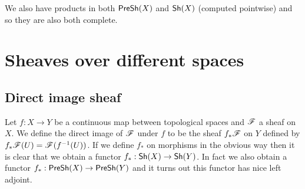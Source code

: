 \documentclass{memoir}
\begin{document}
We also have products in both ${\normalfont\mathsf{PreSh}}(X)$ and ${\normalfont\mathsf{Sh}}(X)$ (computed pointwise) and so they are also both complete.
\section{Sheaves over different spaces}
\subsection{Direct image sheaf}
Let $f:X\to Y$ be a continuous map between topological spaces and $\mathscr{F}$ a sheaf on $X$.
We define the direct image of $\mathscr{F}$ under $f$ to be the sheaf $f_*\mathscr{F}$ on $Y$ defined by $f_*\mathscr{F}(U) = \mathscr{F}(f^{-1}(U))$.
If we define $f_*$ on morphisms in the obvious way then it is clear that we obtain a functor $f_*:{\normalfont\mathsf{Sh}}(X)\to{\normalfont\mathsf{Sh}}(Y)$.
In fact we also obtain a functor $f_*:{\normalfont\mathsf{PreSh}}(X)\to{\normalfont\mathsf{PreSh}}(Y)$ and it turns out this functor has nice left adjoint.
\end{document}
